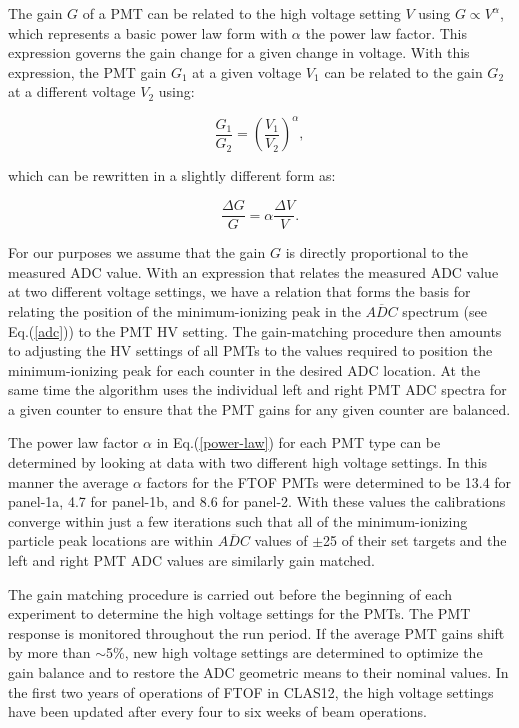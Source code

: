 \documentclass[3p,times,twocolumn]{elsarticle}
\begin{document}
The gain $G$ of a PMT can be related to the high voltage setting $V$ using $G \propto V^\alpha$, which
represents a basic power law form with $\alpha$ the power law factor.  This expression governs the gain
change for a given change in voltage. With this expression, the PMT gain $G_1$ at a given voltage $V_1$ can
be related to the gain $G_2$ at a different voltage $V_2$ using:

\begin{equation}
\label{power-law}
\frac{G_1}{G_2} = \left( \frac{V_1}{V_2} \right) ^\alpha,
\end{equation}

\noindent
which can be rewritten in a slightly different form as:

\begin{equation}
\label{delta}
\frac{\Delta G}{G} = \alpha \frac{\Delta V}{V}.
\end{equation}

\noindent
For our purposes we assume that the gain $G$ is directly proportional to the measured ADC value. With an
expression that relates the measured ADC value at two different voltage settings, we have a relation that
forms the basis for relating the position of the minimum-ionizing peak in the $\overline{ADC}$ spectrum
(see Eq.(\ref{adc})) to the PMT HV setting. The gain-matching procedure then amounts to adjusting the HV
settings of all PMTs to the values required to position the minimum-ionizing peak for each counter in the
desired ADC location. At the same time the algorithm uses the individual left and right PMT ADC spectra for
a given counter to ensure that the PMT gains for any given counter are balanced.

The power law factor $\alpha$ in Eq.(\ref{power-law}) for each PMT type can be determined by looking
at data with two different high voltage settings. In this manner the average $\alpha$ factors for the
FTOF PMTs were determined to be 13.4 for panel-1a, 4.7 for panel-1b, and 8.6 for panel-2. With these
values the calibrations converge within just a few iterations such that all of the minimum-ionizing particle
peak locations are within $\overline{ADC}$ values of $\pm$25 of their set targets and the left and right
PMT ADC values are similarly gain matched.

The gain matching procedure is carried out before the beginning of each experiment to determine the
high voltage settings for the PMTs. The PMT response is monitored throughout the run period. If the
average PMT gains shift by more than $\sim$5\%, new high voltage settings are determined to optimize
the gain balance and to restore the ADC geometric means to their nominal values. In the first two years of
operations of FTOF in CLAS12, the high voltage settings have been updated after every four to six weeks
of beam operations.
\end{document}
